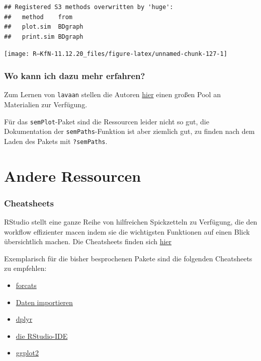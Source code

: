 \documentclass[
]{book}
\begin{document}
\begin{verbatim}
## Registered S3 methods overwritten by 'huge':
##   method    from   
##   plot.sim  BDgraph
##   print.sim BDgraph
\end{verbatim}

\begin{center}\texttt{[image: R---KfN-11.12.20\_files/figure-latex/unnamed-chunk-127-1]} \end{center}

\hypertarget{wo-kann-ich-dazu-mehr-erfahren-4}{%
\subsubsection{Wo kann ich dazu mehr erfahren?}\label{wo-kann-ich-dazu-mehr-erfahren-4}}

Zum Lernen von \texttt{lavaan} stellen die Autoren \href{https://lavaan.ugent.be/resources/teaching.html}{hier} einen großen Pool an Materialien zur Verfügung.

Für das \texttt{semPlot}-Paket sind die Ressourcen leider nicht so gut, die Dokumentation der \texttt{semPaths}-Funktion ist aber ziemlich gut, zu finden nach dem Laden des Pakets mit \texttt{?semPaths}.

\hypertarget{andere-ressourcen}{%
\section{Andere Ressourcen}\label{andere-ressourcen}}

\hypertarget{cheatsheets}{%
\subsubsection{Cheatsheets}\label{cheatsheets}}

RStudio stellt eine ganze Reihe von hilfreichen Spickzetteln zu Verfügung, die den workflow effizienter macen indem sie die wichtigsten Funktionen auf einen Blick übersichtlich machen. Die Cheatsheets finden sich \href{https://rstudio.com/resources/cheatsheets/}{hier}

Exemplarisch für die bisher besprochenen Pakete sind die folgenden Cheatsheets zu empfehlen:

\begin{itemize}
\item
  \href{https://github.com/rstudio/cheatsheets/raw/master/factors.pdf}{forcats}
\item
  \href{https://github.com/rstudio/cheatsheets/raw/master/data-import.pdf}{Daten importieren}
\item
  \href{https://github.com/rstudio/cheatsheets/raw/master/data-transformation.pdf}{dplyr}
\item
  \href{https://github.com/rstudio/cheatsheets/raw/master/rstudio-ide.pdf}{die RStudio-IDE}
\item
  \href{https://github.com/rstudio/cheatsheets/raw/master/data-visualization-2.1.pdf}{ggplot2}
\end{itemize}
\end{document}
